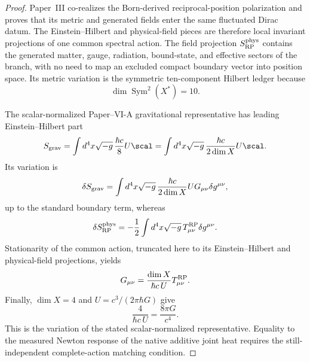 \documentclass[12pt,a4paper]{article}
\begin{document}
\begin{proof}
Paper~III co-realizes the Born-derived reciprocal-position polarization and
proves that its metric and generated fields enter the same fluctuated Dirac
datum.  The Einstein--Hilbert and physical-field pieces are therefore local
invariant projections of one common spectral action.  The field projection
\(S_{\rm RP}^{\rm phys}\) contains the generated matter, gauge, radiation,
bound-state, and effective sectors of the branch, with no need to map an
excluded compact boundary vector into position space.  Its metric variation is
the symmetric ten-component Hilbert ledger because
\[
  \dim\operatorname{Sym}^2(X^*)=10.
\]

The scalar-normalized Paper--VI-A gravitational representative has
leading Einstein--Hilbert part
\[
    S_{\rm grav}
    =
    \int d^4x\sqrt{-g}\,
    \frac{\hbar c}{8}U\scal
    =
    \int d^4x\sqrt{-g}\,
    \frac{\hbar c}{2\dim X}U\scal.
\]
Its variation is
\[
    \delta S_{\rm grav}
    =
    \int d^4x\sqrt{-g}\,
    \frac{\hbar c}{2\dim X}U
    G_{\mu\nu}\delta g^{\mu\nu},
\]
up to the standard boundary term, whereas
\[
    \delta S_{\rm RP}^{\rm phys}
    =
    -\frac12
    \int d^4x\sqrt{-g}\,
    T^{\rm RP}_{\mu\nu}\delta g^{\mu\nu}.
\]
Stationarity of the common action, truncated here to its Einstein--Hilbert
and physical-field projections, yields
\[
    G_{\mu\nu}
    =
    \frac{\dim X}{\hbar c\,U}
    T^{\rm RP}_{\mu\nu}.
\]
Finally, \(\dim X=4\) and
\(U=c^3/(2\pi\hbar G)\) give
\[
    \frac{4}{\hbar c\,U}
    =
    \frac{8\pi G}{c^4}.
\]
This is the variation of the stated scalar-normalized representative.
Equality to the measured Newton response of the native additive joint
heat requires the still-independent complete-action matching condition.
\end{proof}
\end{document}
